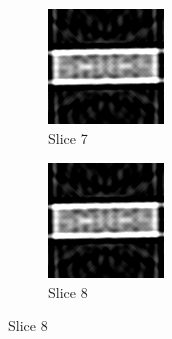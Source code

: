 \documentclass{article}
\begin{document}
\begin{figure}[t!] %
\begin{subfigure}{0.45\textwidth}
\includegraphics[width=\linewidth]{s_07.png}
\caption{Slice 7} \label{fig:a}
\end{subfigure}\hspace*{\fill}
\begin{subfigure}{0.45\textwidth}
\includegraphics[width=\linewidth]{s_08.png}
\caption{Slice 8} \label{fig:b}
\end{subfigure}


\end{figure}
\end{document}
